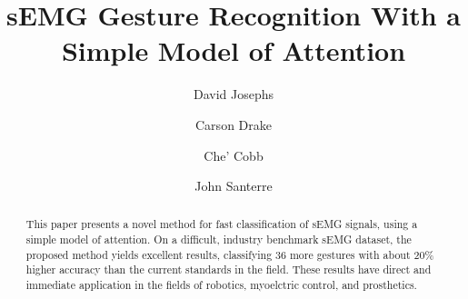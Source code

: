 \documentclass{llncs}
\title{sEMG Gesture Recognition With a Simple Model of Attention}
\author{%
David Josephs\inst{1} \and
Carson Drake\inst{1} \and
Che' Cobb\inst{1} \and
John Santerre\inst{1} %
}
\institute{%
Master of Science in Data Science, Southern Methodist University,
Dallas TX 75275 USA 
\email{\{josephsd, drakec, cobbc\}@smu.edu} %
}
\begin{document}
\maketitle              %

\setcounter{footnote}{0}

\begin{abstract}
This paper presents a novel method for fast classification of sEMG signals, using a simple model of attention. On a difficult, industry benchmark sEMG dataset, the proposed method yields excellent results, classifying 36 more gestures with about 20\% higher accuracy than the current standards in the field. These results have direct and immediate application in the fields of robotics, myoelctric control, and prosthetics.
\end{abstract}










 
 
%
\end{document}

